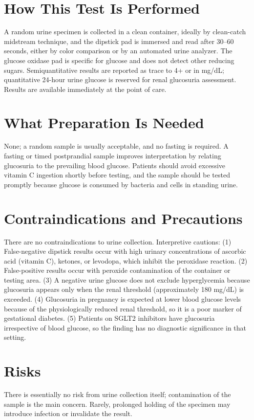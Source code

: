 \section*{How This Test Is Performed}
A random urine specimen is collected in a clean container, ideally by clean-catch midstream technique, and the dipstick pad is immersed and read after 30--60 seconds, either by color comparison or by an automated urine analyzer. The glucose oxidase pad is specific for glucose and does not detect other reducing sugars. Semiquantitative results are reported as trace to 4+ or in mg/dL; quantitative 24-hour urine glucose is reserved for renal glucosuria assessment. Results are available immediately at the point of care.
\section*{What Preparation Is Needed}
None; a random sample is usually acceptable, and no fasting is required. A fasting or timed postprandial sample improves interpretation by relating glucosuria to the prevailing blood glucose. Patients should avoid excessive vitamin C ingestion shortly before testing, and the sample should be tested promptly because glucose is consumed by bacteria and cells in standing urine.
\section*{Contraindications and Precautions}
There are no contraindications to urine collection. Interpretive cautions: (1) False-negative dipstick results occur with high urinary concentrations of ascorbic acid (vitamin C), ketones, or levodopa, which inhibit the peroxidase reaction. (2) False-positive results occur with peroxide contamination of the container or testing area. (3) A negative urine glucose does not exclude hyperglycemia because glucosuria appears only when the renal threshold (approximately 180 mg/dL) is exceeded. (4) Glucosuria in pregnancy is expected at lower blood glucose levels because of the physiologically reduced renal threshold, so it is a poor marker of gestational diabetes. (5) Patients on SGLT2 inhibitors have glucosuria irrespective of blood glucose, so the finding has no diagnostic significance in that setting.
\section*{Risks}
There is essentially no risk from urine collection itself; contamination of the sample is the main concern. Rarely, prolonged holding of the specimen may introduce infection or invalidate the result.

